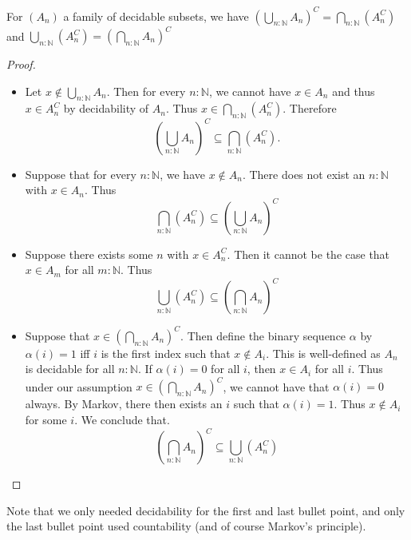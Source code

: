 \begin{lemma}\label{LemDecidableSubsetsDeMorgan}
  For $(A_n)$ a family of decidable subsets, we have
    $
    (\bigcup_{n:\mathbb N} A_n)^C
    =
    \bigcap_{n:\mathbb N} (A_n^C)
    $ 
    and 
    $
    \bigcup_{n:\mathbb N} (A_n^C)
    =  
    (\bigcap_{n:\mathbb N} A_n)^C
    $
\end{lemma}

\begin{proof}
\begin{itemize}
  \item 
    Let 
    $x\notin \bigcup_{n:\mathbb N} A_n$. 
    Then for every $n:\mathbb N$, we cannot have $x\in A_n$
    and thus $x\in A_n^C$ by decidability of $A_n$. 
    Thus $x\in \bigcap_{n:\mathbb N} (A_n^C)$. 
    Therefore
    $$
    (\bigcup_{n:\mathbb N} A_n)^C
    \subseteq 
    \bigcap_{n:\mathbb N} (A_n^C).
    $$ 
  \item 
    Suppose that for every $n:\mathbb N$, we have $x\notin A_n$. 
    There does not exist an $n:\mathbb N$ with $x\in A_n$. Thus
    $$
    \bigcap_{n:\mathbb N} (A_n^C)
    \subseteq 
    (\bigcup_{n:\mathbb N} A_n)^C
    $$ 
  \item 
    Suppose there exists some $n$ with $x\in A_n^C$. Then 
    it cannot be the case that $x\in A_m$ for all $m:\mathbb N$.
    Thus
    $$
    \bigcup_{n:\mathbb N} (A_n^C)
    \subseteq 
    (\bigcap_{n:\mathbb N} A_n)^C
    $$ 
  \item 
    Suppose that $x\in (\bigcap_{n:\mathbb N} A_n)^C$. 
    Then define the binary sequence $\alpha$ by $\alpha(i) =1$ iff $i$ is the first index such that 
    $x\notin A_i$. This is well-defined as $A_n$ is decidable for all $n:\mathbb N$. 
    If $\alpha(i) = 0$ for all $i$, then $x\in A_i$ for all $i$. 
    Thus under our assumption $x\in (\bigcap_{n:\mathbb N} A_n)^C$, 
    we cannot have that $\alpha(i) = 0$ always. 
    By Markov, there then exists an $i$ such that $\alpha(i) = 1$. 
    Thus $x\notin A_i$ for some $i$. We conclude that. 
    $$
    (\bigcap_{n:\mathbb N} A_n)^C
    \subseteq
    \bigcup_{n:\mathbb N} (A_n^C)
    $$ 
\end{itemize}
\end{proof} 
Note that we only needed decidability for the first and last bullet point, 
and only the last bullet point used countability (and of course Markov's principle). 
